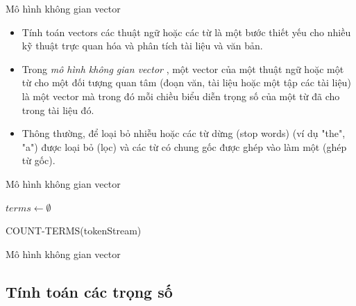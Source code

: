 \documentclass[10pt]{beamer}
\theoremstyle{remark}
\theoremstyle{definition}
\begin{document}
\begin{frame}{Mô hình không gian vector}
	\begin{itemize}
		\item  Tính toán vectors các thuật ngữ hoặc các từ là một bước thiết yếu cho nhiều kỹ thuật trực quan hóa và phân tích tài liệu và văn bản.
		\item Trong \textit{mô hình không gian vector} \cite{356}, một vector của một thuật ngữ hoặc một từ cho một đối tượng quan tâm (đoạn văn, tài liệu hoặc một tập các tài liệu) là một vector mà trong đó mỗi chiều biểu diễn trọng số của một từ đã cho trong tài liệu đó.
		\item Thông thường, để loại bỏ nhiễu hoặc các từ dừng (stop words) (ví dụ "the", "a") được loại bỏ (lọc) và các từ có chung gốc được ghép vào làm một (ghép từ gốc).
	\end{itemize}
\end{frame}


\begin{frame}{Mô hình không gian vector}
	\begin{algorithm}[H]
        \DontPrintSemicolon
        $terms \gets \emptyset$\;
        \;
        \caption{COUNT-TERMS(tokenStream)}
        \label{alg:COUNT-TERMS}
    \end{algorithm}
\end{frame}

\begin{frame}{Mô hình không gian vector}
	\begin{table}[h!]
    \end{table}
\end{frame}

\subsection{Tính toán các trọng số}
\end{document}
